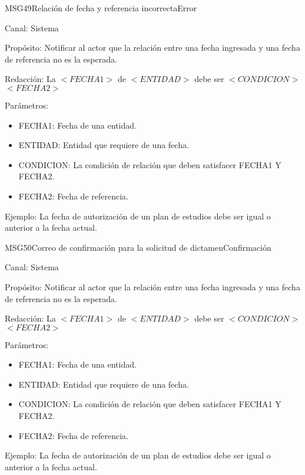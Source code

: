 \begin{mensaje}{MSG49}{Relación de fecha y referencia incorrecta}{Error}
	\item[Canal:] Sistema
	\item[Propósito:] Notificar al actor que la relación entre una fecha ingresada y una fecha de referencia no es la esperada.
	\item[Redacción:] La $<FECHA1>$ de $<ENTIDAD>$ debe ser $<CONDICION>$ $<FECHA2>$
	\item[Parámetros:] 
	\begin{itemize}
		\item FECHA1: Fecha de una entidad.
		\item ENTIDAD: Entidad que requiere de una fecha.
		\item CONDICION: La condición de relación que deben satisfacer FECHA1 Y FECHA2.
		\item FECHA2: Fecha de referencia.
	\end{itemize}
	\item[Ejemplo:] La fecha de autorización de un plan de estudios debe ser igual o anterior a la fecha actual.
	
\end{mensaje}


\begin{mensaje}{MSG50}{Correo de confirmación para la solicitud de dictamen}{Confirmación}
	\item[Canal:] Sistema
	\item[Propósito:] Notificar al actor que la relación entre una fecha ingresada y una fecha de referencia no es la esperada.
	\item[Redacción:] La $<FECHA1>$ de $<ENTIDAD>$ debe ser $<CONDICION>$ $<FECHA2>$
	\item[Parámetros:] 
	\begin{itemize}
		\item FECHA1: Fecha de una entidad.
		\item ENTIDAD: Entidad que requiere de una fecha.
		\item CONDICION: La condición de relación que deben satisfacer FECHA1 Y FECHA2.
		\item FECHA2: Fecha de referencia.
	\end{itemize}
	\item[Ejemplo:] La fecha de autorización de un plan de estudios debe ser igual o anterior a la fecha actual.
	
\end{mensaje}

